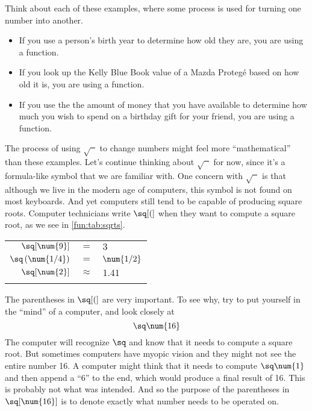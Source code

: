 \begin{pccexample}
Think about each of these examples, where some process is used for turning one number into another. 
\begin{itemize}
	\item If you use a person's birth year to determine how old they are, you are using a function.
	\item If you look up the Kelly Blue Book value of a Mazda Proteg\'{e} based on how old it is, you are using a function.  
	\item If you use the the amount of money that you have available to determine how much 
	you wish to spend on a birthday gift for your friend, you are using a function. 
\end{itemize}
\end{pccexample}

The process of using $\sqrt{\phantom{x}}$ to change numbers might feel more ``mathematical'' 
than these examples. Let's continue thinking about $\sqrt{\phantom{x}}$ for now, since 
it's a formula-like symbol that we are familiar with. One concern with  $\sqrt{\phantom{x}}$ 
is that although we live in the modern age of computers, this symbol is not found on most 
keyboards. And yet computers still tend to be capable of producing square roots. Computer 
technicians write $\sq[(]$ when they want to compute a square root, as we see in \cref{fun:tab:sqrts}.
%
\begin{margintable}
	\centering
	 \label{fun:tab:sqrts}
	\begin{tabular}{r@{}c@{}l}
		\beforeheading
		\afterheading
		$\sq[\num{9}]$              & ${}={}$       & $\num{3}$    \\\normalline
		$\sq\left(\num{1/4}\right)$ & ${}={}$       & $\num{1/2}$  \\\normalline
		$\sq[\num{2}]$              & ${}\approx{}$ & $\num{1.41}$ \\\lastline
	\end{tabular}\end{margintable}
	The parentheses in $\sq[(]$ are very important. To see why, try to put yourself in the 
	``mind'' of a computer, and look closely at 
	\[
		\sq\num{16}
	\]
	The computer will recognize $\sq$ and know that it needs to compute a square root. 
	But sometimes computers have myopic vision and they might not see the entire number \num{16}. A 
	computer might think that it needs to compute $\sq\num{1}$ and then append a ``6'' to the end, which 
	would produce a final result of \num{16}. This is probably not what was intended. And so 
	the purpose of the parentheses in $\sq[\num{16}]$ is to denote exactly what number needs to be operated on. 
	

